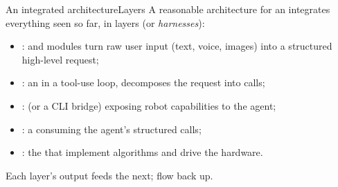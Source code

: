\begin{frame}{An integrated architecture}{Layers}
  \justifying
  A reasonable architecture for an  integrates everything seen so far, in layers (or \emph{harnesses}):
  \begin{itemize}
    \item {}:  and  modules turn raw user input (text, voice, images) into a structured high-level request;
    \item {}: an  in a tool-use loop, decomposes the request into calls;
    \item {}:  (or a CLI bridge) exposing robot capabilities to the agent;
    \item {}: a  consuming the agent's structured calls;
    \item {}: the  that implement algorithms and drive the hardware.
  \end{itemize}
  \bigskip
  Each layer's output feeds the next;  flow back up.
\end{frame}

